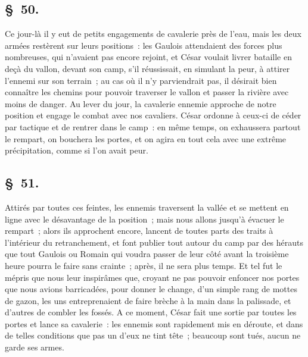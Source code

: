 \documentclass[french,twoside]{book} %
\begin{document}
\subsection[{§ 50.}]{ \textsc{§ 50.} }
\noindent Ce jour-là il y eut de petits engagements de cavalerie près de l’eau, mais les deux armées restèrent sur leurs positions : les Gaulois attendaient des forces plus nombreuses, qui n’avaient pas encore rejoint, et César voulait livrer bataille en deçà du vallon, devant son camp, s’il réussissait, en simulant la peur, à attirer l’ennemi sur son terrain ; au cas où il n’y parviendrait pas, il désirait bien connaître les chemins pour pouvoir traverser le vallon et passer la rivière avec moins de danger. Au lever du jour, la cavalerie ennemie approche de notre position et engage le combat avec nos cavaliers. César ordonne à ceux-ci de céder par tactique et de rentrer dans le camp : en même temps, on exhaussera partout le rempart, on bouchera les portes, et on agira en tout cela avec une extrême précipitation, comme si l’on avait peur.
\subsection[{§ 51.}]{ \textsc{§ 51.} }
\noindent Attirés par toutes ces feintes, les ennemis traversent la vallée et se mettent en ligne avec le désavantage de la position ; mais nous allons jusqu’à évacuer le rempart ; alors ils approchent encore, lancent de toutes parts des traits à l’intérieur du retranchement, et font publier tout autour du camp par des hérauts que tout Gaulois ou Romain qui voudra passer de leur côté avant la troisième heure pourra le faire sans crainte ; après, il ne sera plus temps. Et tel fut le mépris que nous leur inspirâmes que, croyant ne pas pouvoir enfoncer nos portes que nous avions barricadées, pour donner le change, d’un simple rang de mottes de gazon, les uns entreprenaient de faire brèche à la main dans la palissade, et d’autres de combler les fossés. A ce moment, César fait une sortie par toutes les portes et lance sa cavalerie : les ennemis sont rapidement mis en déroute, et dans de telles conditions que pas un d’eux ne tint tête ; beaucoup sont tués, aucun ne garde ses armes.
\end{document}
